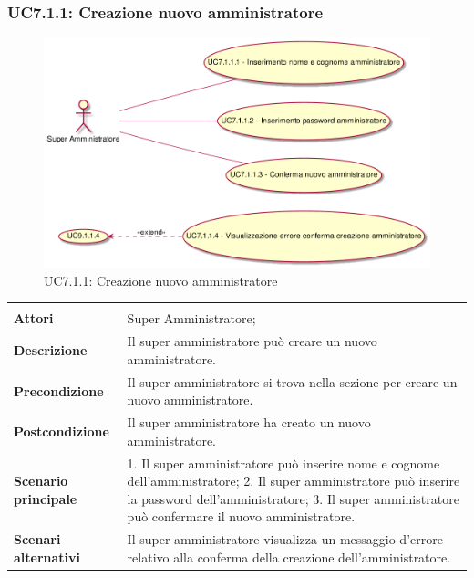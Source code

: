 \subsubsection{UC7.1.1: Creazione nuovo amministratore}
\label{UC7.1.1}\newpage
\begin{figure}[h]
\centering
\includegraphics[width=\textwidth,height=\textheight,keepaspectratio]{images/UseCaseUC7.1.1.png}
\caption{UC7.1.1: Creazione nuovo amministratore}
\end{figure}
\begin{longtable}{l|p{10cm}}
\hline
&\\
\textbf{Attori} & Super Amministratore;\\[7pt]
\textbf{Descrizione} & Il super amministratore può creare un nuovo amministratore.\\[7pt]
\textbf{Precondizione} & Il super amministratore si trova nella sezione per creare un nuovo amministratore.\\[7pt]
\textbf{Postcondizione} & Il super amministratore ha creato un nuovo amministratore.\\[7pt]
\textbf{Scenario principale} & 1. Il super amministratore può inserire nome e cognome dell'amministratore;
2. Il super amministratore può inserire la password dell'amministratore;
3. Il super amministratore può confermare il nuovo amministratore.\\[7pt]
\textbf{Scenari alternativi} & Il super amministratore visualizza un messaggio d'errore relativo alla conferma della creazione dell'amministratore.\\[7pt]\hline
\end{longtable}

